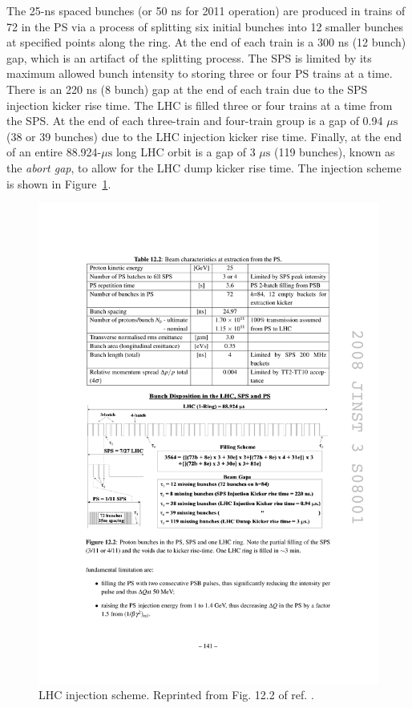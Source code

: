 \documentclass[dissertation.tex]{subfiles}
\begin{document}
The 25-ns spaced bunches (or 50 ns for 2011 operation) are produced in trains of 72 in the PS via a process of splitting six initial bunches into 12 smaller bunches at specified points along the ring.  At the end of each train is a 300 ns (12 bunch) gap, which is an artifact of the splitting process.  The SPS is limited by its maximum allowed bunch intensity to storing three or four PS trains at a time.  There is an 220 ns (8 bunch) gap at the end of each train due to the SPS injection kicker rise time.  The LHC is filled three or four trains at a time from the SPS.  At the end of each three-train and four-train group is a gap of 0.94 $\mu\mbox{s}$ (38 or 39 bunches) due to the LHC injection kicker rise time.  Finally, at the end of an entire 88.924-$\mu\mbox{s}$ long LHC orbit is a gap of 3 $\mu\mbox{s}$ (119 bunches), known as the \textit{abort gap}, to allow for the LHC dump kicker rise time.  The injection scheme is shown in Figure~\ref{fig:LHC_injection_scheme}.

\begin{figure}
	\centering
	\includegraphics[scale=1.0]{LHC_injection_scheme}
	\caption{LHC injection scheme.  Reprinted from Fig. 12.2 of ref. \cite{LHC_paper}.}
	\label{fig:LHC_injection_scheme}
\end{figure}
\end{document}
